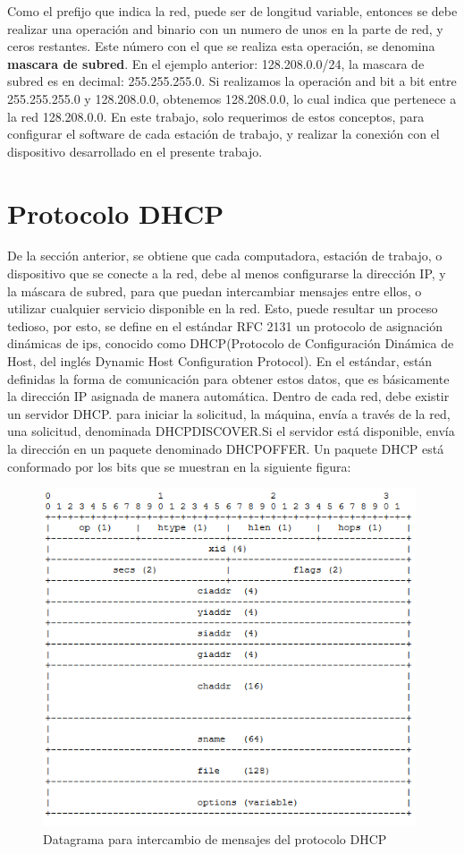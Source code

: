 Como el prefijo que indica la red, puede ser de longitud variable, entonces se debe realizar una operación and binario con un numero de unos en la parte de red, y ceros restantes. Este número con el que se realiza esta operación, se denomina \textbf{mascara de subred}. En el ejemplo anterior: 128.208.0.0/24, la mascara de subred es en decimal: 255.255.255.0. Si realizamos la operación and bit a bit entre 255.255.255.0 y 128.208.0.0, obtenemos 128.208.0.0, lo cual indica que pertenece a la red 128.208.0.0. En este trabajo, solo requerimos de estos conceptos, para configurar el software de cada estación de trabajo, y realizar la conexión con el dispositivo desarrollado en el presente trabajo.     
 
\section{Protocolo DHCP} 

De la sección anterior, se obtiene que cada computadora, estación de trabajo, o dispositivo que se conecte a la red, debe al menos configurarse la dirección IP, y la máscara de subred, para que puedan intercambiar mensajes entre ellos, o utilizar cualquier servicio disponible en la red. Esto, puede resultar un proceso tedioso, por esto, se define en el estándar RFC 2131\cite{RFCDHCP} un protocolo de asignación dinámicas de ips, conocido como DHCP(Protocolo de Configuración Dinámica de Host,
del inglés Dynamic Host Configuration Protocol). En el estándar, están definidas la forma de comunicación para obtener estos datos, que es básicamente la dirección IP asignada de manera automática.  
Dentro de cada red, debe existir un servidor DHCP. para iniciar la solicitud, la máquina, envía a través de la red, una solicitud, denominada DHCPDISCOVER.Si el servidor está disponible, envía la dirección en un paquete denominado DHCPOFFER. 
Un paquete DHCP está conformado por los bits que se muestran en la siguiente figura: 
\begin{figure}[ht]
	\includegraphics[width=\textwidth,height=10cm]{paqdhcp}
	\caption{Datagrama para intercambio de mensajes del protocolo DHCP}
	\label{fig:pqdhcp}
\end{figure} 


